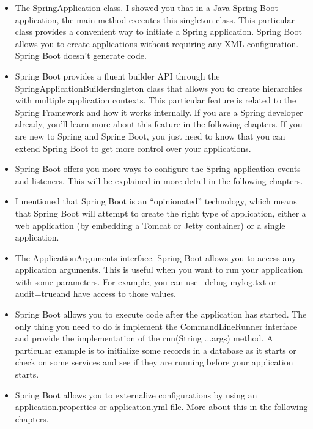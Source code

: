 \begin{itemize}
	\item The SpringApplication class. I showed you that in a Java Spring Boot application, the main method executes this singleton class. This particular class provides a convenient way to initiate a Spring application. Spring Boot allows you to create applications without requiring any XML configuration. Spring Boot doesn’t generate code. 
	
	\item Spring Boot provides a fluent builder API through the  SpringApplicationBuildersingleton class that allows you to create hierarchies with multiple application contexts. This particular feature is related to the Spring Framework and how it works internally. If you are a Spring developer already, you’ll learn more about this feature in the following chapters. If you are new to Spring and Spring Boot, you just need to know that you can extend Spring Boot to get more control over your applications. 
	
	\item Spring Boot offers you more ways to configure the Spring application events and listeners. This will be explained in more detail in the following chapters.
	
	\item I mentioned that Spring Boot is an “opinionated” technology, which means that Spring Boot will attempt to create the right type of application, either a web application (by embedding a Tomcat or Jetty container) or a single application.
	
	\item The   ApplicationArguments  interface. Spring Boot allows you to access any application arguments. This is useful when you want to run your application with some parameters. For example, you can use  --debug mylog.txt  or  --audit=trueand have access to those values.
	
	\item Spring Boot allows you to execute code after the application has started. The only thing you need to do is implement the  CommandLineRunner  interface and provide the implementation of the  run(String ...args)  method. A particular example is to initialize some records in a database as it starts or check on some services and see if they are running before your application starts.  
	
	\item Spring Boot allows you to externalize configurations by using an  application.properties  or  application.yml  file. More about this in the following chapters. 
	

\end{itemize}
